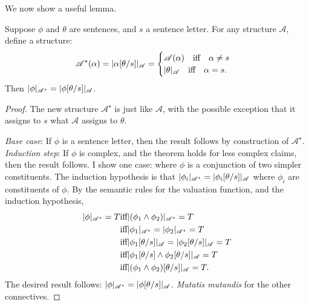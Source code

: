 We now show a useful lemma. \begin{lemma}[Substitution]\label{sublem}
	Suppose $\phi$ and $\theta$ are sentences, and $s$ a sentence letter. For any structure $\mathscr{A}$, define a structure: $$\mathscr{A}^{\star}(\alpha) = 	|\alpha[\theta/s]|_{\mathscr{A}} = \begin{cases} \mathscr{A}(\alpha) \quad\text{iff}\quad \alpha \neq s \\
	|\theta|_{\mathscr{A}} \quad\text{iff}\quad \alpha = s.
		\end{cases}$$ Then $|\phi|_{\mathscr{A^{\star}}}= |\phi[\theta/s]|_{\mathscr{A}}$. 
\begin{proof}	The new structure $\mathscr{A}^{\star}$ is just like $\mathscr{A}$, with the possible exception that it assigns to $s$ what $\mathscr{A}$ assigns to $\theta$.

\emph{Base case}: If $\phi$ is a sentence letter, then the result follows by construction of $\mathscr{A}^{\star}$.\\
		\emph{Induction step}: If $\phi$ is complex, and the theorem holds for less complex claims, then the result follows. I show one case: where $\phi$ is a conjunction of two simpler constituents. The induction hypothesis is that  $|\phi_{i}|_{\mathscr{A^{\star}}} = |\phi_{i}[\theta/s]|_{\mathscr{A}}$ where $\phi_{i}$ are constituents of $\phi$.
By the semantic rules for the valuation function, and the induction hypothesis, \begin{align*}
	|\phi|_{\mathscr{A^{\star}}} = T &\text{iff} |(\phi_{1} \wedge \phi_{2})|_{\mathscr{A^{\star}}} = T\\ &\text{iff} |\phi_{1}|_{\mathscr{A^{\star}}}=|\phi_{2}|_{\mathscr{A^{\star}}}=T\\ &\text{iff} |\phi_{1}[\theta/s]|_{\mathscr{A}}=|\phi_{2}[\theta/s]|_{\mathscr{A}}=T\\ &\text{iff} |\phi_{1}[\theta/s] \wedge \phi_{2}[\theta/s]|_{\mathscr{A}}=T\\ &\text{iff} |(\phi_{1} \wedge \phi_{2})[\theta/s]|_{\mathscr{A}}=T.
\end{align*}
The desired result follows: $|\phi|_{\mathscr{A^{\star}}} = |\phi[\theta/s]|_{\mathscr{A}}$. \emph{Mutatis mutandis} for the other connectives. 
\end{proof} 
\end{lemma}


